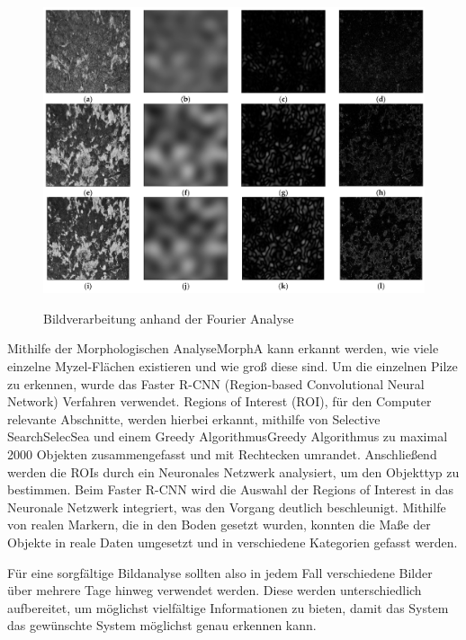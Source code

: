 \begin{figure}[H]
\centering
\includegraphics[width=\textwidth]{images/mushroomFreq.png}
\caption{Bildverarbeitung anhand der Fourier Analyse}\cite{rainpoint_smart_timer}\cite{barauskas2022approach}
\label{fig:mushroomDiagramm}
\end{figure}

Mithilfe der Morphologischen Analyse\gls{MorphA} kann erkannt werden, wie viele einzelne Myzel-Flächen existieren und wie groß diese sind. Um die einzelnen Pilze zu erkennen, wurde das Faster R-CNN (Region-based Convolutional Neural Network) Verfahren verwendet. Regions of Interest (ROI), für den Computer relevante Abschnitte, werden hierbei erkannt, mithilfe von Selective Search\gls{SelecSea} und einem Greedy Algorithmus\gls{Greedy Algorithmus} zu maximal 2000 Objekten zusammengefasst und mit Rechtecken umrandet.\cite{object_detection_algorithms} Anschließend werden die ROIs durch ein Neuronales Netzwerk analysiert, um den Objekttyp zu bestimmen. Beim Faster R-CNN wird die Auswahl der Regions of Interest in das Neuronale Netzwerk integriert, was den Vorgang deutlich beschleunigt. Mithilfe von realen Markern, die in den Boden gesetzt wurden, konnten die Maße der Objekte in reale Daten umgesetzt und in verschiedene Kategorien gefasst werden.

Für eine sorgfältige Bildanalyse sollten also in jedem Fall verschiedene Bilder über mehrere Tage hinweg verwendet werden. Diese werden unterschiedlich aufbereitet, um möglichst vielfältige Informationen zu bieten, damit das System das gewünschte System möglichst genau erkennen kann.

